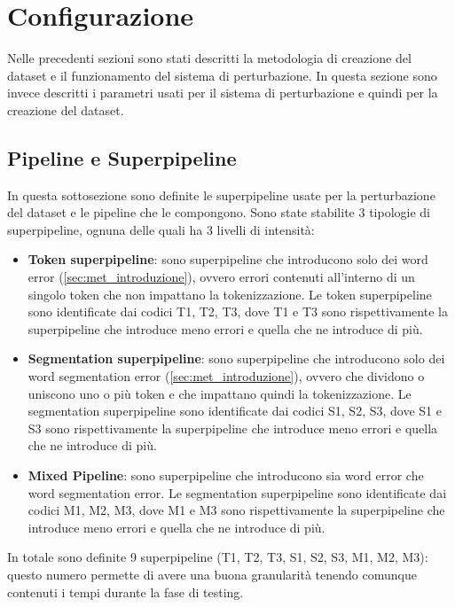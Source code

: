 \section{Configurazione}
\label{dst:configurazione}
Nelle precedenti sezioni sono stati descritti la metodologia di creazione del dataset e il funzionamento del sistema di perturbazione. In questa sezione sono invece descritti i parametri usati per il sistema di perturbazione e quindi per la creazione del dataset.

\subsection{Pipeline e Superpipeline}
\label{sec:dst_pipsup}
In questa sottosezione sono definite le superpipeline usate per la perturbazione del dataset e le pipeline che le compongono. Sono state stabilite 3 tipologie di superpipeline, ognuna delle quali ha 3 livelli di intensità:

\begin{itemize}
\item \textbf{Token superpipeline}: sono superpipeline che introducono solo dei word error (\autoref{sec:met_introduzione}), ovvero errori contenuti all'interno di un singolo token che non impattano la tokenizzazione. Le token superpipeline sono identificate dai codici T1, T2, T3, dove T1 e T3 sono rispettivamente la superpipeline che introduce meno errori e quella che ne introduce di più.

\item \textbf{Segmentation superpipeline}: sono superpipeline che introducono solo dei word segmentation error (\autoref{sec:met_introduzione}), ovvero che dividono o uniscono uno o più token e che impattano quindi la tokenizzazione. Le segmentation superpipeline sono identificate dai codici S1, S2, S3, dove S1 e S3 sono rispettivamente la superpipeline che introduce meno errori e quella che ne introduce di più.

\item \textbf{Mixed Pipeline}: sono superpipeline che introducono sia word error che word segmentation error. Le segmentation superpipeline sono identificate dai codici M1, M2, M3, dove M1 e M3 sono rispettivamente la superpipeline che introduce meno errori e quella che ne introduce di più.
\end{itemize}

In totale sono definite 9 superpipeline (T1, T2, T3, S1, S2, S3, M1, M2, M3): questo numero permette di avere una buona granularità tenendo comunque contenuti i tempi durante la fase di testing.

